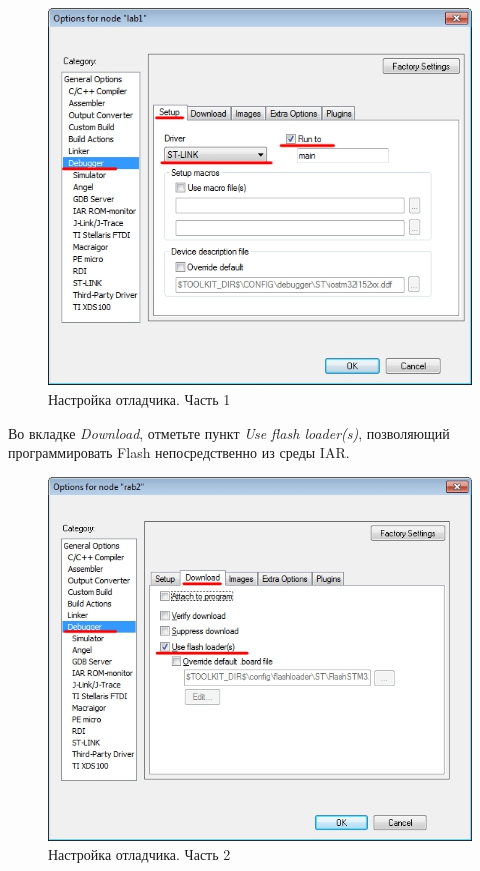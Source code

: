 \begin{figure}[h!]
\begin{center}
\includegraphics[scale=0.5]{Image/16.jpg}
\end{center}
\caption{Настройка отладчика. Часть 1}
\end{figure}

Во вкладке \textit{Download}, отметьте пункт \textit{Use flash loader(s)}, позволяющий программировать Flash непосредственно из среды IAR.


\begin{figure}[h!]
\begin{center}
\includegraphics[scale=0.5]{Image/17.jpg}
\end{center}
\caption{Настройка отладчика. Часть 2}
\end{figure}

